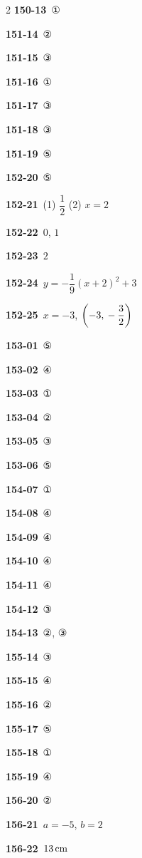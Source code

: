 \documentclass[10pt,a4paper]{article}
\begin{document}
\begin{multicols}{2}
\noindent\textbf{150-13}\ ①\par
\noindent\textbf{151-14}\ ②\par
\noindent\textbf{151-15}\ ③\par
\noindent\textbf{151-16}\ ①\par
\noindent\textbf{151-17}\ ③\par
\noindent\textbf{151-18}\ ③\par
\noindent\textbf{151-19}\ ⑤\par
\noindent\textbf{152-20}\ ⑤\par
\noindent\textbf{152-21}\ (1) $\dfrac{1}{2}$ (2) $x=2$\par
\noindent\textbf{152-22}\ $0$, $1$\par
\noindent\textbf{152-23}\ $2$\par
\noindent\textbf{152-24}\ $y=-\dfrac{1}{9}(x+2)^2+3$\par
\noindent\textbf{152-25}\ $x=-3$, $\left(-3{,}\mkern3mu -\dfrac{3}{2}\right)$\par
\noindent\textbf{153-01}\ ⑤\par
\noindent\textbf{153-02}\ ④\par
\noindent\textbf{153-03}\ ①\par
\noindent\textbf{153-04}\ ②\par
\noindent\textbf{153-05}\ ③\par
\noindent\textbf{153-06}\ ⑤\par
\noindent\textbf{154-07}\ ①\par
\noindent\textbf{154-08}\ ④\par
\noindent\textbf{154-09}\ ④\par
\noindent\textbf{154-10}\ ④\par
\noindent\textbf{154-11}\ ④\par
\noindent\textbf{154-12}\ ③\par
\noindent\textbf{154-13}\ ②, ③\par
\noindent\textbf{155-14}\ ③\par
\noindent\textbf{155-15}\ ④\par
\noindent\textbf{155-16}\ ②\par
\noindent\textbf{155-17}\ ⑤\par
\noindent\textbf{155-18}\ ①\par
\noindent\textbf{155-19}\ ④\par
\noindent\textbf{156-20}\ ②\par
\noindent\textbf{156-21}\ $a=-5$, $b=2$\par
\noindent\textbf{156-22}\ $13\mkern3mu \mathrm{cm}$\par

\end{multicols}
\end{document}
